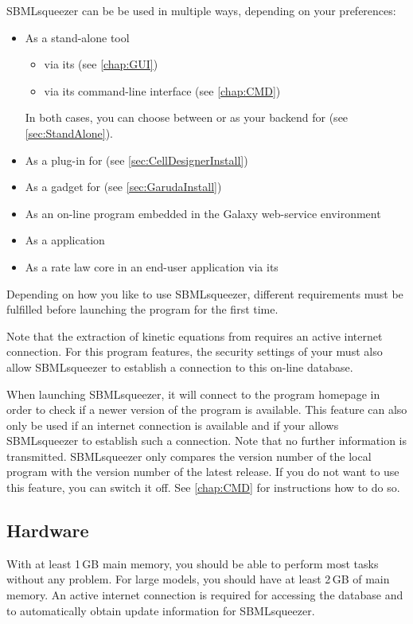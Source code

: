 SBMLsqueezer can be be used in multiple ways, depending on your preferences:
\begin{itemize}
  \item As a stand-alone tool
  \begin{itemize}
    \item via its \GUI (see \vref{chap:GUI})
    \item via its command-line interface (see \vref{chap:CMD})
  \end{itemize}
        In both cases, you can choose between \JSBML or \libSBML as your backend
        for \SBML (see \vref{sec:StandAlone}).
  \item As a plug-in for \CellDesigner (see \vref{sec:CellDesignerInstall})
  \item As a gadget for \Garuda (see \vref{sec:GarudaInstall})
  \item As an on-line program embedded in the Galaxy web-service environment \citet{Goecks2010}
  \item As a \JavaWebStart application
  \item As a rate law core in an end-user application via its \API
\end{itemize}
Depending on how you like to use SBMLsqueezer, different requirements must be
fulfilled before launching the program for the first time.

Note that the extraction of kinetic equations from \SABIO requires an active internet connection.
For this program features, the security settings of your \OS must also allow SBMLsqueezer to establish a connection to this on-line database.

When launching SBMLsqueezer, it will connect to the program homepage in order to check if a newer version of the program is available.
This feature can also only be used if an internet connection is available and if your \OS allows SBMLsqueezer to establish such a connection.
Note that no further information is transmitted.
SBMLsqueezer only compares the version number of the local program with the version number of the latest release.
If you do not want to use this feature, you can switch it off.
See \vref{chap:CMD} for instructions how to do so.

\subsection{Hardware}

With at least 1\,GB main memory, you should be able to perform most tasks
without any problem. For large models, you should have at least 2\,GB of main
memory. An active internet connection is required for accessing the \SABIO
database and to automatically obtain update information for SBMLsqueezer.

